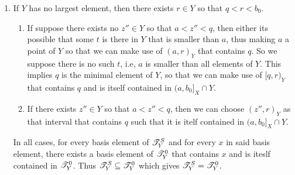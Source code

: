 \documentclass[main.tex]{subfiles}
\begin{document}
{\begin{enumerate}
    \item If $Y$ has no largest element, then there exists $r\in Y$ so that $q<r<b_0$. \begin{enumerate}
        \item If suppose there exists no $z'' \in Y$ so that $a<z''<q$, then either its possible that some $t$ is there in $Y$ that is smaller than $a$, thus making $a$ a point of $Y$ so that we can make use of $(a,r)_Y$ that contains $q$. So we suppose there is no such $t$, i.e, $a$ is smaller than all elements of $Y$. This implies $q$ is the minimal element of $Y$, so that we can make use of $[q,r)_Y$ that contains $q$ and is itself contained in $(a,b_0]_X \cap Y$.
        \item If there exists $z'' \in Y$ so that $a<z''<q$, then we can choose $(z'',r)_Y$ as that interval that contains $q$ such that it is itelf contained in $(a,b_0]_X \cap Y$.
    \end{enumerate} 
In all cases, for every basis element of $\mathscr T^S_Y$ and for every $x$ in said basis element, there exists a basis element of $\mathscr T^0_Y$ that contains $x$ and is iteslf contained in $\mathscr T^0_Y$. Thus $\mathscr T^S_Y \subseteq \mathscr T^0_Y$ which gives $\mathscr T^S_Y=\mathscr T^0_Y$.
\end{enumerate}
} 
\end{document}
